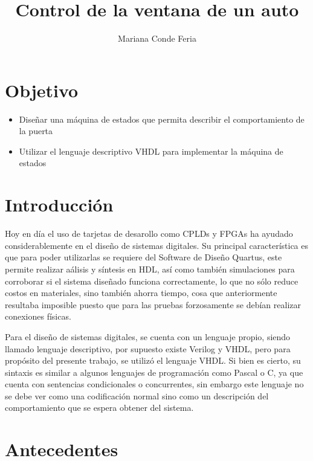 \documentclass{article}
\title{Control de la ventana de un auto}
\author{Mariana Conde Feria}
\begin{document}
\renewcommand{\contentsname}{Índice General}
\maketitle
\tableofcontents
\newpage
\listoffigures

\newpage
\section{Objetivo}
\begin{itemize}
    \item Diseñar una máquina de estados que permita describir el comportamiento de la puerta
    \item Utilizar el lenguaje descriptivo VHDL para implementar la máquina de estados 
    
\end{itemize}
\section{Introducción}
Hoy en día el uso de tarjetas de desarollo como CPLDs y FPGAs ha ayudado considerablemente en el diseño de sistemas digitales. Su principal característica es que para poder utilizarlas se requiere del Software de Diseño Quartus, este permite realizar aálisis y síntesis en HDL, así como también simulaciones para corroborar si el sistema diseñado funciona correctamente, lo que no sólo reduce costos en materiales, sino también ahorra tiempo, cosa que anteriormente resultaba imposible puesto que para las pruebas forzosamente se debían realizar conexiones físicas. 

Para el diseño de sistemas digitales, se cuenta con un lenguaje propio, siendo llamado lenguaje descriptivo, por supuesto existe Verilog y VHDL, pero para propósito del presente trabajo, se utilizó el lenguaje VHDL. Si bien es cierto, su sintaxis es similar a algunos lenguajes de programación como Pascal o C, ya que cuenta con sentencias condicionales o concurrentes, sin embargo este lenguaje no se debe ver como una codificación normal sino como un descripción del comportamiento que se espera obtener del sistema.
\section{Antecedentes}
\end{document}
